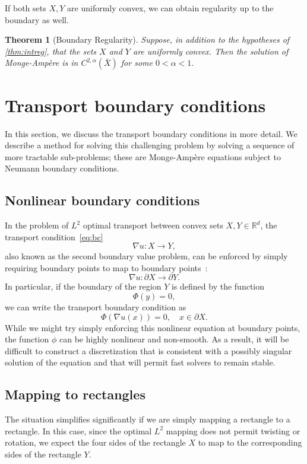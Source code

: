 \documentclass{amsart}
\newtheorem{theorem}{Theorem}
\theoremstyle{lemma}
\theoremstyle{remark}
\begin{document}
If both sets $X,Y$ are uniformly convex, we can obtain regularity up to the boundary as well.
\begin{theorem}[Boundary Regularity]\label{them:bdyreg}
Suppose, in addition to the hypotheses of \autoref{thm:intreg}, that the sets $X$ and $Y$ are uniformly convex.  Then the solution of {{Monge-Amp\`ere}\xspace} is in $C^{2,\alpha}(\bar{X})$ for some $0<\alpha<1$.
\end{theorem}

\section{Transport boundary conditions}\label{sec:transportbc}
In this section, we discuss the transport boundary conditions in more detail.  We describe a method for solving this challenging problem by solving a sequence of more tractable sub-problems; these are {{Monge-Amp\`ere}\xspace} equations subject to Neumann boundary conditions.

\subsection{Nonlinear boundary conditions}\label{sec:nonlinbc}
In the problem of $L^2$ optimal transport between convex sets $X,Y\in{\mathbb{R}}^d$, the transport condition~\eqref{eq:bc}
\[ \nabla u:X\to Y, \]
also known as the second boundary value problem, can be enforced by simply requiring boundary points to map to boundary points~\cite{Pogorelov,TrudWang2ndBVP,Urbas2ndBVP}:
\[ \nabla u:\partial X \to \partial Y. \]
In particular, if the boundary of the region $Y$ is defined by the function
\[ \Phi(y) = 0, \]
we can write the transport boundary condition as
\begin{equation}\label{eq:BC2} \Phi(\nabla u(x)) = 0, \quad x\in\partial X. \end{equation}
While we might try simply enforcing this nonlinear equation at boundary points, the function $\phi$ can be highly nonlinear and non-smooth.  As a result, it will be difficult to construct a discretization that is consistent with a possibly singular solution of the equation and that will permit fast solvers to remain stable.

\subsection{Mapping to rectangles}\label{sec:rect}
The situation simplifies significantly if we are simply mapping a rectangle to a rectangle.  In this case, since the optimal $L^2$ mapping does not permit twisting or rotation, we expect the four sides of the rectangle $X$ to map to the corresponding sides of the rectangle $Y$.  
\end{document}
